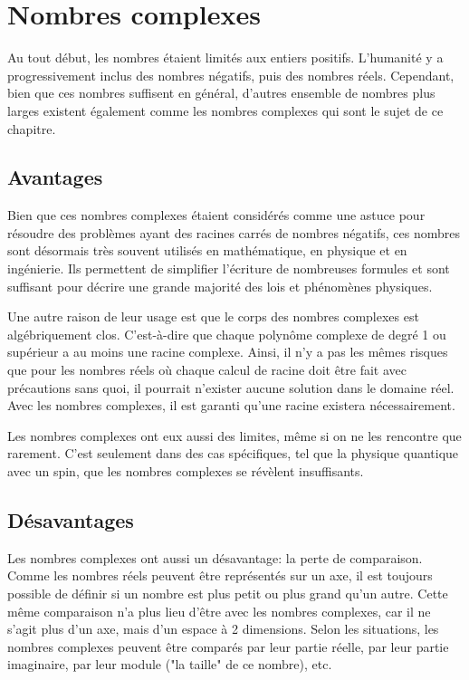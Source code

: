 \section{Nombres complexes}

Au tout début, les nombres étaient limités aux entiers positifs. L'humanité y a progressivement inclus des nombres négatifs, puis des nombres réels. Cependant, bien que ces nombres suffisent en général, d'autres ensemble de nombres plus larges existent également comme les nombres complexes qui sont le sujet de ce chapitre.

\subsection{Avantages}

Bien que ces nombres complexes étaient considérés comme une astuce pour résoudre des problèmes ayant des racines carrés de nombres négatifs, ces nombres sont désormais très souvent utilisés en mathématique, en physique et en ingénierie. Ils permettent de simplifier l'écriture de nombreuses formules et sont suffisant pour décrire une grande majorité des lois et phénomènes physiques.

Une autre raison de leur usage est que le corps des nombres complexes est algébriquement clos. C'est-à-dire que chaque polynôme complexe de degré 1 ou supérieur a au moins une racine complexe. Ainsi, il n'y a pas les mêmes risques que pour les nombres réels où chaque calcul de racine doit être fait avec précautions sans quoi, il pourrait n'exister aucune solution dans le domaine réel. Avec les nombres complexes, il est garanti qu'une racine existera nécessairement.

Les nombres complexes ont eux aussi des limites, même si on ne les rencontre que rarement. C'est seulement dans des cas spécifiques, tel que la physique quantique avec un spin, que les nombres complexes se révèlent insuffisants.

\subsection{Désavantages}

Les nombres complexes ont aussi un désavantage: la perte de comparaison. Comme les nombres réels peuvent être représentés sur un axe, il est toujours possible de définir si un nombre est plus petit ou plus grand qu'un autre. Cette même comparaison n'a plus lieu d'être avec les nombres complexes, car il ne s'agit plus d'un axe, mais d'un espace à 2 dimensions. Selon les situations, les nombres complexes peuvent être comparés par leur partie réelle, par leur partie imaginaire, par leur module ("la taille" de ce nombre), etc.


